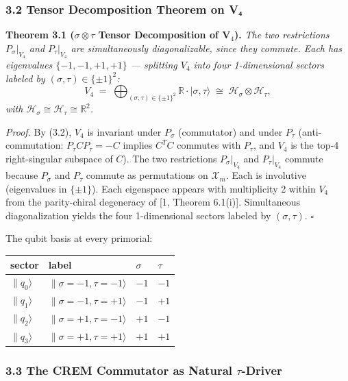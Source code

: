 \documentclass[
]{article}
\newcounter{none} %
\begin{document}
\subsubsection{3.2 Tensor Decomposition Theorem on
V₄}\label{tensor-decomposition-theorem-on-vux2084}

\textbf{Theorem 3.1 (\(\sigma\otimes\tau\) Tensor Decomposition of
V\(_4\)).} \emph{The two restrictions \(P_\sigma|_{V_4}\) and
\(P_\tau|_{V_4}\) are simultaneously diagonalizable, since they commute.
Each has eigenvalues \(\{-1, -1, +1, +1\}\) --- splitting \(V_4\) into
four 1-dimensional sectors labeled by
\((\sigma, \tau) \in \{\pm 1\}^2\):}
\[V_4 \;=\; \bigoplus_{(\sigma, \tau) \in \{\pm 1\}^2} \mathbb{R} \cdot |\sigma, \tau\rangle \;\cong\; \mathcal{H}_\sigma \otimes \mathcal{H}_\tau, \tag{3.3}\]
\emph{with
\(\mathcal{H}_\sigma \cong \mathcal{H}_\tau \cong \mathbb{R}^2\).}

\emph{Proof.} By (3.2), \(V_4\) is invariant under \(P_\sigma\)
(commutator) and under \(P_\tau\) (anti-commutation:
\(P_\tau C P_\tau = -C\) implies \(C^T C\) commutes with \(P_\tau\), and
\(V_4\) is the top-4 right-singular subspace of \(C\)). The two
restrictions \(P_\sigma|_{V_4}\) and \(P_\tau|_{V_4}\) commute because
\(P_\sigma\) and \(P_\tau\) commute as permutations on
\(\mathcal{X}_m\). Each is involutive (eigenvalues in \(\{\pm 1\}\)).
Each eigenspace appears with multiplicity 2 within \(V_4\) from the
parity-chiral degeneracy of {[}1, Theorem 6.1(i){]}. Simultaneous
diagonalization yields the four 1-dimensional sectors labeled by
\((\sigma, \tau)\). \(\square\)

The qubit basis at every primorial:

{\def\LTcaptype{none} %
\begin{longtable}[]{@{}llll@{}}
\toprule\noalign{}
sector & label & \(\sigma\) & \(\tau\) \\
\midrule\noalign{}
\endhead
\bottomrule\noalign{}
\endlastfoot
\(\|q_0\rangle\) & \(\|\sigma{=}{-}1, \tau{=}{-}1\rangle\) & \(-1\) &
\(-1\) \\
\(\|q_1\rangle\) & \(\|\sigma{=}{-}1, \tau{=}{+}1\rangle\) & \(-1\) &
\(+1\) \\
\(\|q_2\rangle\) & \(\|\sigma{=}{+}1, \tau{=}{-}1\rangle\) & \(+1\) &
\(-1\) \\
\(\|q_3\rangle\) & \(\|\sigma{=}{+}1, \tau{=}{+}1\rangle\) & \(+1\) &
\(+1\) \\
\end{longtable}
}

\subsubsection{\texorpdfstring{3.3 The CREM Commutator as Natural
\(\tau\)-Driver}{3.3 The CREM Commutator as Natural \textbackslash tau-Driver}}\label{the-crem-commutator-as-natural-tau-driver}
\end{document}
